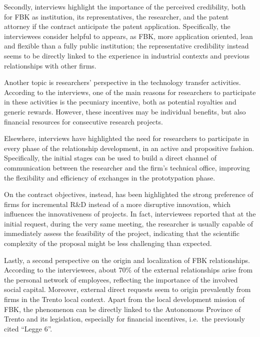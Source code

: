 Secondly, interviews highlight the importance of the perceived credibility, both for FBK as institution, its representatives, the researcher, and the patent attorney if the contract anticipate the patent application. Specifically, the interviewees consider helpful to appears, as FBK, more application oriented, lean and flexible than a fully public institution; the representative credibility instead seems to be directly linked to the experience in industrial contexts and previous relationships with other firms. 

Another topic is researchers’ perspective in the technology transfer activities. According to the interviews, one of the main reasons for researchers to participate in these activities is the pecuniary incentive, both as potential royalties and generic rewards. However, these incentives may be individual benefits, but also financial resources for consecutive research projects.  

Elsewhere, interviews have highlighted the need for researchers to participate in every phase of the relationship development, in an active and propositive fashion. Specifically, the initial stages can be used to build a direct channel of communication between the researcher and the firm's technical office, improving the flexibility and efficiency of exchanges in the prototypation phase.

On the contract objectives, instead, has been highlighted the strong preference of firms for incremental R\&D instead of a more disruptive innovation, which influences the innovativeness of projects. In fact, interviewees reported that at the initial request, during the very same meeting, the researcher is usually capable of immediately assess the feasibility of the project, indicating that the scientific complexity of the proposal might be less challenging than expected.

Lastly, a second perspective on the origin and localization of FBK relationships. According to the interviewees, about 70\% of the external relationships arise from the personal network of employees, reflecting the importance of the involved social capital. Moreover, external direct requests seem to origin prevalently from firms in the Trento local context. Apart from the local development mission of FBK, the phenomenon can be directly linked to the Autonomous Province of Trento and its legislation, especially for financial incentives, i.e.\ the previously cited \enquote{Legge 6}.

